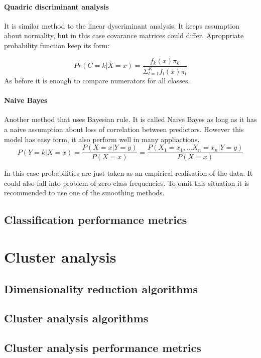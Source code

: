 \documentclass[10pt]{article}\usepackage[]{graphicx}\usepackage[]{color}
\begin{document}
\paragraph{Quadric discriminant analysis}
It is similar method to the linear dyscriminant analysis. It keeps assumption 
about normality, but in this case covarance matrices could differ. 
Aproppriate probability function keep its form: 
  
$$
  Pr(C=k|X=x) = \frac{f_k(x)\pi_k}{\Sigma_{l=1}^K f_l(x)\pi_l}
$$
As before it is enough to compare numerators for all classes.
\paragraph{Naive Bayes}
Another method that uses Bayesian rule. It is called Naive Bayes as long as it 
has a naive assumption about loss of correlation between predictors. 
However this model has easy form, it also perform well in many appliactions. 
$$
  P(Y=k|X=x) = \frac{P(X=x|Y=y)}{P(X=x)} = \frac{P(X_1=x_1,\ldots X_n=x_n|Y=y)}{P(X=x)}  
$$
  
In this case probabilities are just taken as an empirical realisation of the 
data.
It could also fall into problem of zero class frequencies. To omit this 
situation it is recommended to use one of the smoothing methods.

\clearpage
\subsection{Classification performance metrics}







\clearpage
\section{Cluster analysis}

\subsection{Dimensionality reduction algorithms}

\subsection{Cluster analysis algorithms}

\subsection{Cluster analysis performance metrics}
\end{document}
